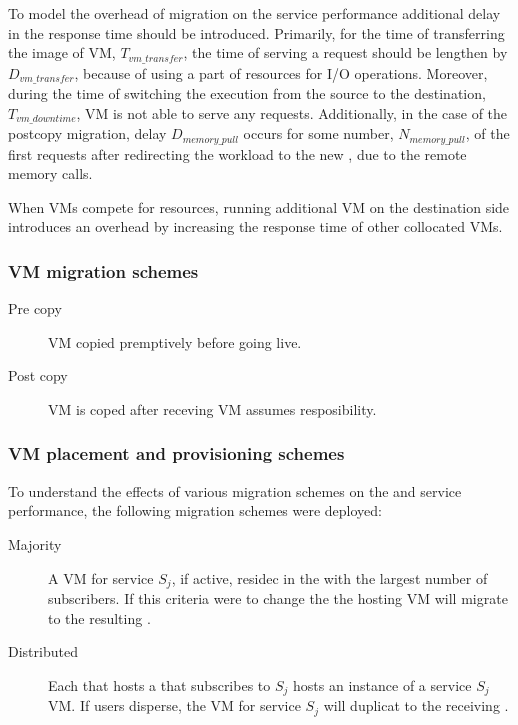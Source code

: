 To model the overhead of migration on the service performance additional delay in the response time should be introduced.
Primarily, for the time of transferring the image of VM, $T_{vm\_transfer}$, the time of serving a request should be lengthen by $D_{vm\_transfer}$, because of using a part of resources for I/O operations.
Moreover, during the time of switching the execution from the source to the destination, $T_{vm\_downtime}$, VM is not able to serve any requests.
Additionally, in the case of the postcopy migration, delay  $D_{memory\_pull}$ occurs for some number, $N_{memory\_pull}$, of the first requests after redirecting the workload to the new \dc{}, due to the remote memory calls.

When VMs compete for resources, running additional VM on the destination side introduces an overhead by increasing the response time of other collocated VMs.

\subsubsection{VM migration schemes}

\begin{description}
\item[Pre copy] VM copied premptively before going live.
\item[Post copy] VM is coped after receving VM assumes resposibility.
\end{description}

\subsubsection{VM placement and \dc{} provisioning schemes}
To understand the effects of various migration schemes on the \dc and service performance, the following migration schemes were deployed:

\begin{description}
\item[Majority] A VM for service $S_j$, if active, residec in the \dc with the largest number of subscribers. If this criteria were to change the the hosting VM will migrate to the resulting \dc.
\item[Distributed] Each \dc that hosts a \ue that subscribes to $S_j$ hosts an instance of a service $S_j$ VM. If users disperse, the VM for service $S_j$ will duplicat to the receiving \dc.
\end{description}